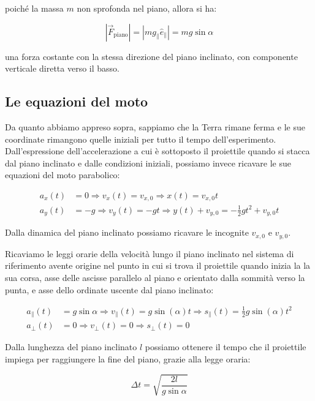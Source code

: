 \documentclass{article}
\begin{document}
poiché la massa $m$ non sprofonda nel piano, allora si ha:

\begin{equation}
|\vec{F}_\text{piano}| =  |mg_\parallel\hat{e}_\parallel| = mg \sin\alpha
\end{equation}

una forza costante con la stessa direzione del piano inclinato,
con componente verticale diretta verso il basso.

\subsection{Le equazioni del moto}
Da quanto abbiamo appreso sopra, sappiamo che la Terra rimane ferma
e le sue coordinate rimangono quelle iniziali per tutto il tempo
dell'esperimento.
Dall'espressione dell'accelerazione a cui è sottoposto il proiettile
quando si stacca dal piano inclinato e dalle condizioni iniziali,
possiamo invece ricavare le sue equazioni del moto parabolico:

\begin{align}
a_x(t) &= 0 \Rightarrow v_x(t) = v_{x,0} \Rightarrow x(t) = v_{x,0}t \\
a_y(t) &= -g \Rightarrow v_y(t) = - g t \Rightarrow y(t) + v_{y,0} = - \frac{1}{2} g t^2 + v_{y,0} t  
\end{align}

Dalla dinamica del piano inclinato possiamo ricavare le incognite $v_{x,0}$ e $v_{y,0}$.

Ricaviamo le leggi orarie della velocità lungo il piano inclinato nel sistema di riferimento
avente origine nel punto in cui si trova il proiettile quando inizia la la sua corsa, asse delle
ascisse parallelo al piano e orientato dalla sommità verso la punta, e asse dello ordinate uscente
dal piano inclinato:

\begin{align}
a_\parallel(t) &= g \sin\alpha \Rightarrow v_\parallel(t) = g \sin(\alpha) t \Rightarrow s_\parallel(t) = \frac{1}{2} g \sin(\alpha) t^2 \\
a_\perp(t) &= 0 \Rightarrow v_\perp(t) = 0 \Rightarrow s_\perp(t) = 0
\end{align}

Dalla lunghezza del piano inclinato $l$ possiamo ottenere il tempo che il proiettile
impiega per raggiungere la fine del piano, grazie alla legge oraria:

\begin{equation}
\Delta t = \sqrt{\frac{2l}{g\sin{\alpha}}}
\end{equation}
\end{document}
